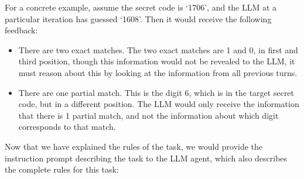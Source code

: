 For a concrete example, assume the secret code is `1706', and the LLM at a particular iteration has guessed `1608'. Then it would receive the following feedback:
\begin{itemize}
    \item There are two exact matches. The two exact matches are 1 and 0, in first and third position, though this information would not be revealed to the LLM, it must reason about this by looking at the information from all previous turns.
    \item There are one partial match. This is the digit 6, which is in the target secret code, but in a different position. The LLM would only receive the information that there is 1 partial match, and not the information about which digit corresponds to that match.
\end{itemize}

Now that we have explained the rules of the task, we would provide the instruction prompt describing the task to the LLM agent, which also describes the complete rules for this task:

